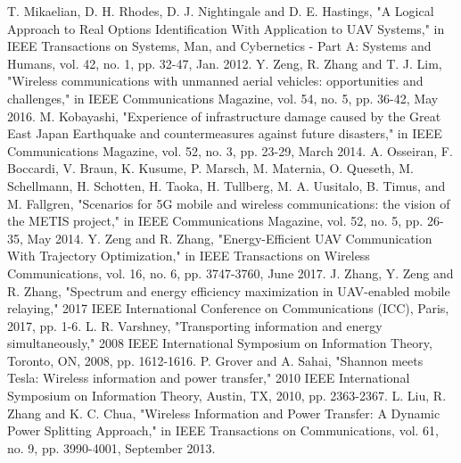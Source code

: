 \documentclass[12pt, draftclsnofoot, onecolumn]{IEEEtran}
\begin{document}
%
%


\ifCLASSOPTIONcaptionsoff
  \newpage
\fi

\begin{thebibliography}{99}
T. Mikaelian, D. H. Rhodes, D. J. Nightingale and D. E. Hastings, "A Logical Approach to Real Options Identification With Application to UAV Systems," in IEEE Transactions on Systems, Man, and Cybernetics - Part A: Systems and Humans, vol. 42, no. 1, pp. 32-47, Jan. 2012.
Y. Zeng, R. Zhang and T. J. Lim, "Wireless communications with unmanned aerial vehicles: opportunities and challenges," in IEEE Communications Magazine, vol. 54, no. 5, pp. 36-42, May 2016.
M. Kobayashi, "Experience of infrastructure damage caused by the Great East Japan Earthquake and countermeasures against future disasters," in IEEE Communications Magazine, vol. 52, no. 3, pp. 23-29, March 2014.
A. Osseiran, F. Boccardi, V. Braun, K. Kusume, P. Marsch, M. Maternia, O. Queseth, M. Schellmann, H. Schotten, H. Taoka, H. Tullberg, M. A. Uusitalo, B. Timus, and M. Fallgren, "Scenarios for 5G mobile and wireless communications: the vision of the METIS project," in IEEE Communications Magazine, vol. 52, no. 5, pp. 26-35, May 2014.
Y. Zeng and R. Zhang, "Energy-Efficient UAV Communication With Trajectory Optimization," in IEEE Transactions on Wireless Communications, vol. 16, no. 6, pp. 3747-3760, June 2017.
J. Zhang, Y. Zeng and R. Zhang, "Spectrum and energy efficiency maximization in UAV-enabled mobile relaying," 2017 IEEE International Conference on Communications (ICC), Paris, 2017, pp. 1-6.
L. R. Varshney, "Transporting information and energy simultaneously," 2008 IEEE International Symposium on Information Theory, Toronto, ON, 2008, pp. 1612-1616.
P. Grover and A. Sahai, "Shannon meets Tesla: Wireless information and power transfer," 2010 IEEE International Symposium on Information Theory, Austin, TX, 2010, pp. 2363-2367.
L. Liu, R. Zhang and K. C. Chua, "Wireless Information and Power Transfer: A Dynamic Power Splitting Approach," in IEEE Transactions on Communications, vol. 61, no. 9, pp. 3990-4001, September 2013.

\end{thebibliography}
\end{document}
